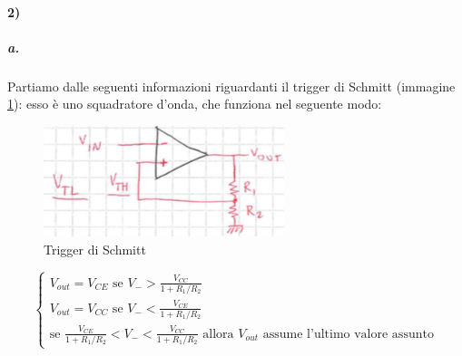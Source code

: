 \documentclass{article}
\begin{document}
	\paragraph{2)}
	\subparagraph{a.}
		Partiamo dalle seguenti informazioni riguardanti il trigger di Schmitt (immagine \ref{fig:smith}): esso è uno squadratore d'onda, che funziona nel seguente modo:\newline
		\begin{figure}
			\label{fig:smith}
			\centering
			\includegraphics[width=70mm]{immagini/smitha.png}
			\caption{Trigger di Schmitt}
		\end{figure}
		\begin{equation}
			\begin{cases}
				V_{out}=V_{CE}\textrm{ se }V_->\frac{V_{CC}}{1+R_1/R_2}\\
				V_{out}=V_{CC}\textrm{ se }V_-<\frac{V_{CE}}{1+R_1/R_2}\\
				\textrm{se }\frac{V_{CE}}{1+R_1/R_2}<V_-<\frac{V_{CC}}{1+R_1/R_2}\textrm{ allora }V_{out}\textrm{ assume l'ultimo valore assunto}
			\end{cases}
		\end{equation}
\end{document}
